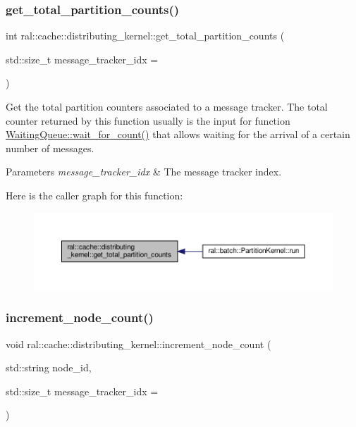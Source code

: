 \subsubsection{\texorpdfstring{get\+\_\+total\+\_\+partition\+\_\+counts()}{get\_total\_partition\_counts()}}
{\footnotesize\ttfamily int ral\+::cache\+::distributing\+\_\+kernel\+::get\+\_\+total\+\_\+partition\+\_\+counts (\begin{DoxyParamCaption}\item[{std\+::size\+\_\+t}]{message\+\_\+tracker\+\_\+idx = {} }\end{DoxyParamCaption})}



Get the total partition counters associated to a message tracker. The total counter returned by this function usually is the input for function \hyperlink{classral_1_1cache_1_1WaitingQueue_abd7d9824f1b89ead2c937e1c6d64ba4f}{Waiting\+Queue\+::wait\+\_\+for\+\_\+count()} that allows waiting for the arrival of a certain number of messages. 


\begin{DoxyParams}{Parameters}
{\em message\+\_\+tracker\+\_\+idx} & The message tracker index. \\
\hline
\end{DoxyParams}
Here is the caller graph for this function\+:\nopagebreak
\begin{figure}[H]
\begin{center}
\leavevmode
\includegraphics[width=350pt]{classral_1_1cache_1_1distributing__kernel_ae5f1a597fc3716c344b54b6d0d6af311_icgraph}
\end{center}
\end{figure}
\mbox{\label{classral_1_1cache_1_1distributing__kernel_a304a30bf1847aab1dd6a9779bbc80929}} 
\subsubsection{\texorpdfstring{increment\+\_\+node\+\_\+count()}{increment\_node\_count()}}
{\footnotesize\ttfamily void ral\+::cache\+::distributing\+\_\+kernel\+::increment\+\_\+node\+\_\+count (\begin{DoxyParamCaption}\item[{std\+::string}]{node\+\_\+id,  }\item[{std\+::size\+\_\+t}]{message\+\_\+tracker\+\_\+idx = {} }\end{DoxyParamCaption})}



